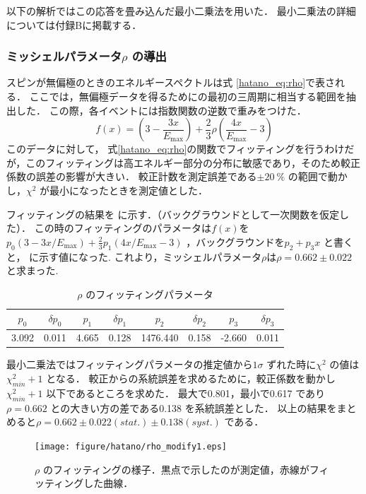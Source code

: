 以下の解析ではこの応答を畳み込んだ最小二乗法を用いた．
最小二乗法の詳細については付録Bに掲載する．

\subsubsection{ミッシェルパラメータ$\rho$ の導出}
スピンが無偏極のときのエネルギースペクトルは式 \eqref{hatano_eq:rho}で表される．
ここでは，無偏極データを得るためにの最初の三周期に相当する範囲を抽出した．
この際，各イベントには指数関数の逆数で重みをつけた．
\begin{equation}
  f(x)=(3 - \frac{3x}{E_\mathrm{max}})+\frac{2}{3}\rho(\frac{4x}{E_\mathrm{max}} - 3)
  \label{hatano_eq:rho}
\end{equation}
このデータに対して， 式\eqref{hatano_eq:rho}の関数でフィッティングを行うわけだが，このフィッティングは高エネルギー部分の分布に敏感であり，そのため較正係数の誤差の影響が大きい．
較正計数を測定誤差である$\pm 20~\%$ の範囲で動かし，$\chi^2$ が最小になったときを測定値とした．

フィッティングの結果を に示す．（バックグラウンドとして一次関数を仮定した）．
この時のフィッティングのパラメータは$f(x)$を$p_0(3 - 3x / E_\mathrm{max}) + \frac{2}{3} p_{1} (4x / E_\mathrm{max} - 3)$ ，バックグラウンドを$p_2+p_3x$ と書くと， に示す値になった.
これより，ミッシェルパラメータ$\rho$は$\rho=0.662 \pm 0.022$ と求まった.

\begin{table}[hbt]
\centering
\caption{$\rho$ のフィッティングパラメータ}
\begin{tabular}{cc|cc|cc|cc}
$p_0$ & $\delta p_0$ & $p_1$ & $\delta p_1$ & $p_2$ & $\delta p_2$ & $p_3$ & $\delta p_3$ \\ \hline
3.092 & 0.011 & 4.665 & 0.128 & 1476.440 & 0.158 & -2.660 & 0.011
\end{tabular}
\label{hatano_tab:rho}
\end{table}

最小二乗法ではフィッティングパラメータの推定値から$1\sigma$ ずれた時に$\chi^2$ の値は$\chi^2_{min}+1$ となる\cite{leo}． 
較正からの系統誤差を求めるために，較正係数を動かし$\chi^{2}_{min} + 1$ 以下であるところを求めた．
最大で0.801，最小で0.617 であり$\rho=0.662$ との大きい方の差である0.138 を系統誤差とした．
以上の結果をまとめると$\rho=0.662 \pm 0.022 (stat.) \pm 0.138 (syst.)$ である．

\begin{figure}[hbt]
\centering
\texttt{[image: figure/hatano/rho\_modify1.eps]}
\caption{$\rho$ のフィッティングの様子．黒点で示したのが測定値，赤線がフィッティングした曲線．}
\label{hatano_fig:rho}
\end{figure}

